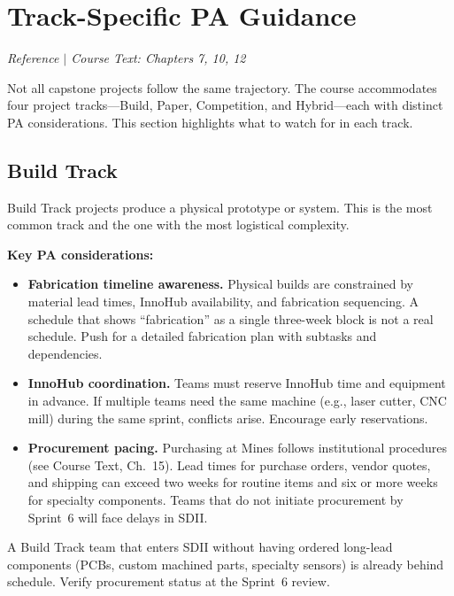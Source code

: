 \section{Track-Specific PA Guidance}
\textit{Reference $|$ Course Text: Chapters 7, 10, 12}

Not all capstone projects follow the same trajectory. The course accommodates four project tracks---Build, Paper, Competition, and Hybrid---each with distinct PA considerations. This section highlights what to watch for in each track.

\subsection{Build Track}

Build Track projects produce a physical prototype or system. This is the most common track and the one with the most logistical complexity.

\textbf{Key PA considerations:}

\begin{itemize}[nosep,leftmargin=1.5em]
\item \textbf{Fabrication timeline awareness.} Physical builds are constrained by material lead times, InnoHub availability, and fabrication sequencing. A schedule that shows ``fabrication'' as a single three-week block is not a real schedule. Push for a detailed fabrication plan with subtasks and dependencies.

\item \textbf{InnoHub coordination.} Teams must reserve InnoHub time and equipment in advance. If multiple teams need the same machine (e.g., laser cutter, CNC mill) during the same sprint, conflicts arise. Encourage early reservations.

\item \textbf{Procurement pacing.} Purchasing at Mines follows institutional procedures (see Course Text, Ch.~15). Lead times for purchase orders, vendor quotes, and shipping can exceed two weeks for routine items and six or more weeks for specialty components. Teams that do not initiate procurement by Sprint~6 will face delays in SDII.
\end{itemize}

\begin{redflag}
A Build Track team that enters SDII without having ordered long-lead components (PCBs, custom machined parts, specialty sensors) is already behind schedule. Verify procurement status at the Sprint~6 review.
\end{redflag}

